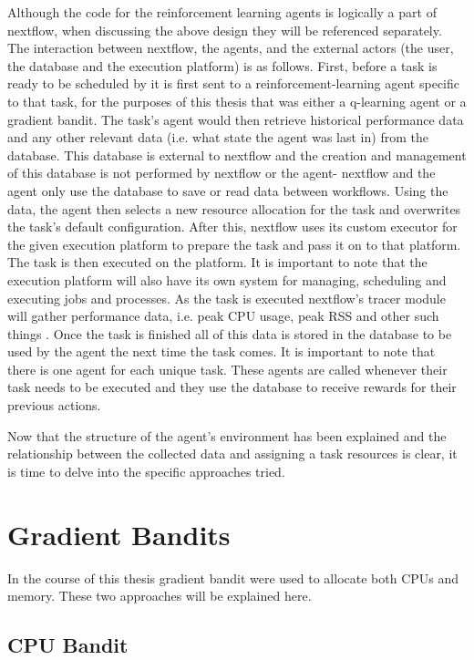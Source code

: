 Although the code for the reinforcement learning agents is logically a part of nextflow, when discussing the above design they will be referenced separately. The interaction between nextflow, the agents, and the external actors (the user, the database and the execution platform) is as follows. First, before a task is ready to be scheduled by it is first sent to a reinforcement-learning agent specific to that task, for the purposes of this thesis that was either a q-learning agent or a gradient bandit. The task’s agent would then retrieve historical performance data and any other relevant data (i.e. what state the agent was last in) from the database. This database is external to nextflow and the creation and management of this database is not performed by nextflow or the agent- nextflow and the agent only use the database to save or read data between workflows. Using the data, the agent then selects a new resource allocation for the task and overwrites the task’s default configuration. After this, nextflow uses its custom executor for the given execution platform to prepare the task and pass it on to that platform. The task is then executed on the platform. It is important to note that the execution platform will also have its own system for managing, scheduling and executing jobs and processes. As the task is executed nextflow’s tracer module will gather performance data, i.e. peak CPU usage, peak RSS and other such things \cite{TracingAndVisualisation}. Once the task is finished all of this data is stored in the  database to be used by the agent the next time the task comes. It is important to note that there is one agent for each unique task. These agents are called whenever their task needs to be executed and they use the database to receive rewards for their previous actions. 

Now that the structure of the agent’s environment has been explained and the relationship between the collected data and assigning a task resources is clear, it is time to delve into the specific approaches tried.

\section{Gradient Bandits}
\label{sec:gradient_bandits}

In the course of this thesis gradient bandit were used to allocate both CPUs and memory. These two approaches will be explained here.

\subsection{CPU Bandit}
\label{sub:cpu_bandit}

